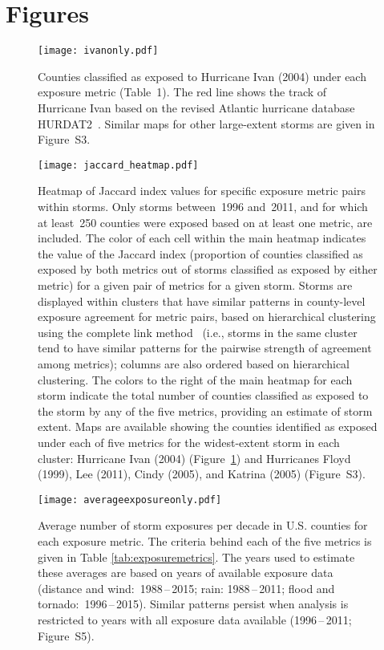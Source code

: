 \section*{Figures}

\listoffigures

\clearpage

\begin{figure}%
\centering
\texttt{[image: ivanonly.pdf]}
\caption{Counties classified as exposed to Hurricane Ivan (2004) under each
exposure metric (Table~1). The red line shows the track of Hurricane Ivan 
based on the revised Atlantic hurricane database \ac{HURDAT2}~\citep{landsea2013}.
Similar maps for other large-extent storms are given in Figure~S3.}
\label{fig:ivanexposure} 
\end{figure}

\clearpage

\begin{figure}%
\centering 
\texttt{[image: jaccard\_heatmap.pdf]} 
\caption{Heatmap of Jaccard index values for specific exposure metric pairs
within storms. Only storms between~1996 and~2011, and for which at least~250
counties were exposed based on at least one metric, are included. The color of
each cell within the main heatmap indicates the value of the Jaccard index
(proportion of counties classified as exposed by both metrics out of storms
classified as exposed by either metric) for a given pair of metrics for a given
storm. Storms are displayed within clusters that have similar patterns in
county-level exposure agreement for metric pairs, based on hierarchical
clustering using the complete link method~\citep{murtagh2012algorithms} (i.e.,
storms in the same cluster tend to have similar patterns for the pairwise
strength of agreement among metrics); columns are also ordered based on
hierarchical clustering. The colors to the right of the main heatmap for each
storm indicate the total number of counties classified as exposed to the storm
by any of the five metrics, providing an estimate of storm extent. Maps are
available showing the counties identified as exposed under each of five metrics
for the widest-extent storm in each cluster: Hurricane Ivan (2004)
(Figure~\ref{fig:ivanexposure}) and Hurricanes Floyd (1999), Lee (2011), Cindy
(2005), and Katrina (2005) (Figure~S3).} 
\label{fig:jaccard}
\end{figure}

\clearpage

\begin{figure}%
\centering
\texttt{[image: averageexposureonly.pdf]} 
\caption{Average number of storm exposures per decade in U.S. counties for each
exposure metric. The criteria behind each of the five metrics is given in Table
\ref{tab:exposuremetrics}. The years used to estimate these averages are based
on years of available exposure data (distance and wind:~1988\,--\,2015; rain:
1988\,--\,2011; flood and tornado:~1996\,--\,2015). Similar patterns persist when
analysis is restricted to years with all exposure data available (1996\,--\,2011;
Figure~S5).} 
\label{fig:averageexposure} 
\end{figure}

